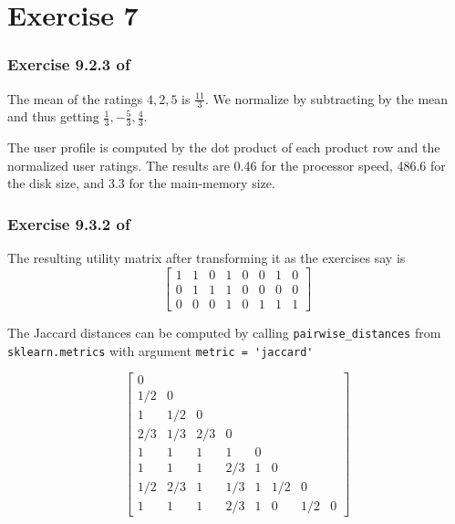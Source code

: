 \documentclass{article}
\begin{document}
\section*{Exercise 7}

\subsubsection*{Exercise 9.2.3 of \cite{mmds}}

The mean of the ratings \(4, 2, 5\) is \(\frac{11}{3}\).
We normalize by subtracting by the mean and thus getting
\(\frac{1}{3}, -\frac{5}{3}, \frac{4}{3}\).

The user profile is computed by the dot product of each product row
and the normalized user ratings.
The results are 0.46 for the processor speed,
486.6 for the disk size,
and 3.3 for the main-memory size.

\subsubsection*{Exercise 9.3.2 of \cite{mmds}}

The resulting utility matrix after transforming it as the exercises say is
\begin{equation*}
    \begin{bmatrix}
        1 & 1 & 0 & 1 & 0 & 0 & 1 & 0\\
        0 & 1 & 1 & 1 & 0 & 0 & 0 & 0\\
        0 & 0 & 0 & 1 & 0 & 1 & 1 & 1
    \end{bmatrix}
\end{equation*}

The Jaccard distances can be computed by calling
\verb|pairwise_distances| from 
\verb|sklearn.metrics|
with argument \verb|metric = 'jaccard'|

\begin{equation*}
    \begin{bmatrix}
        0\\
        1/2 & 0\\
        1 & 1/2 & 0\\
        2/3 & 1/3 & 2/3 & 0\\
        1 & 1 & 1 & 1 & 0\\
        1 & 1 & 1 & 2/3 & 1 & 0\\
        1/2 & 2/3 & 1 & 1/3 & 1 & 1/2 & 0\\
        1 & 1 & 1 & 2/3 & 1 & 0 & 1/2 & 0
    \end{bmatrix}
\end{equation*}
\end{document}

